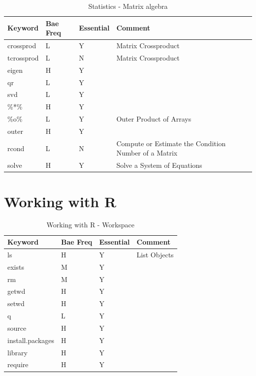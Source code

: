 \documentclass[10pt,]{krantz}
\theoremstyle{definition}
\theoremstyle{definition}
\theoremstyle{remark}
\begin{document}
\begin{table}

\caption{\label{tab:knitchunk20}Statistics - Matrix algebra }
\centering
\begin{tabular}[t]{llll}
\toprule
Keyword & Bae Freq & Essential & Comment\\
\midrule
crossprod & L & Y & Matrix Crossproduct\\
tcrossprod & L & N & Matrix Crossproduct\\
eigen & H & Y & \\
qr & L & Y & \\
svd & L & Y & \\
\addlinespace
\%*\% & H & Y & \\
\%o\% & L & Y & Outer Product of Arrays\\
outer & H & Y & \\
rcond & L & N & Compute or Estimate the Condition Number of a Matrix\\
solve & H & Y & Solve a System of Equations\\
\bottomrule
\end{tabular}
\end{table}

\section{Working with R}\label{working-with-r}

\begin{table}

\caption{\label{tab:knitchunk21}Working with R - Workspace }
\centering
\begin{tabular}[t]{llll}
\toprule
Keyword & Bae Freq & Essential & Comment\\
\midrule
ls & H & Y & List Objects\\
exists & M & Y & \\
rm & M & Y & \\
getwd & H & Y & \\
setwd & H & Y & \\
\addlinespace
q & L & Y & \\
source & H & Y & \\
install.packages & H & Y & \\
library & H & Y & \\
require & H & Y & \\
\bottomrule
\end{tabular}
\end{table}
\end{document}
